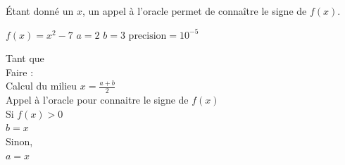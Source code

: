 \begin{namedtheorem}[Oracle]
	Étant donné un $x$, un appel à l'oracle permet de connaître le signe de $f(x)$.
\end{namedtheorem}

\begin{namedtheorem}
	$f(x) = x^2 - 7$
	$a = 2$
	$b = 3$
	$\text{precision} = 10^{-5}$
	
	Tant que \\
	Faire : \\
		Calcul du milieu $x = \frac{a+b}2$ \\
		Appel à l'oracle pour connaitre le signe de $f(x)$ \\
		Si $f(x) > 0$ \\
		$b = x$ \\
		Sinon, \\
		$a = x$ \\
\end{namedtheorem}


